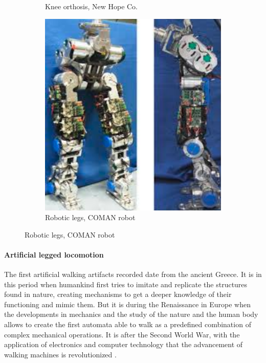 \begin{figure}[h]
\begin{subfigure}[b]{0.3\textwidth}
        \caption{Knee orthosis, New Hope Co.}
        \label{fig:orthotic_leg}
    \end{subfigure}
    \centering
    \begin{subfigure}[b]{0.3\textwidth}
        \includegraphics[width=\textwidth]{figures/robotic_leg.pdf}
        \caption{Robotic legs, COMAN robot \cite{coman}}
        \label{fig:robotic_leg}
    \end{subfigure}
\end{figure}

\paragraph{Artificial legged locomotion} %
\label{par:humanoid_robots}  
The first artificial walking artifacts recorded date from the ancient Greece.
It is in this period when humankind first tries to imitate and replicate the structures found in nature, creating mechanisms to get a deeper knowledge of their functioning and mimic them.
But it is during the Renaissance in Europe when the developments in mechanics and the study of the nature and the human body allows to create the first automata able to walk as a predefined combination of complex mechanical operations.
It is after the Second World War, with the application of electronics and computer technology that the advancement of walking machines is revolutionized \cite{legged_mot_history1}.


